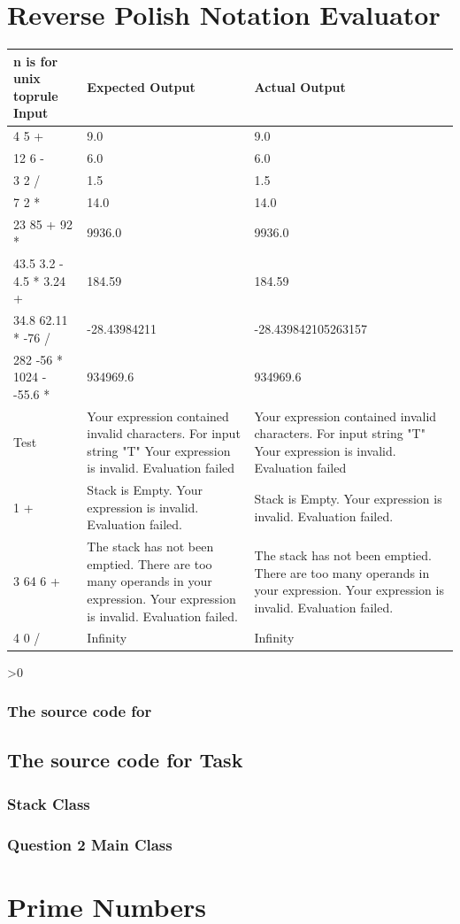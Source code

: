 \documentclass[12pt,a4paper,onesided]{report}
\newcommand{\source}{\pagebreak
	\ifnum\value{section}>0
		\subsection{The source code for \thesection}

	\else
		\section{The source code for Task \thechapter}

	\fi
	}
\begin{document}
\chapter{Reverse Polish Notation Evaluator}
\begin{table}[h!]
	\centering
\begin{tabular}{lp{28ex}p{28ex}}
	\\n is for unix 
	toprule Input & Expected Output & Actual Output\\
	\midrule
	4 5 + & 9.0 & 9.0\\
	12 6 - & 6.0 & 6.0\\
	3 2 / & 1.5 & 1.5 \\
	7 2 * & 14.0 & 14.0\\
	23 85 + 92 * & 9936.0 & 9936.0 \\
	43.5 3.2 - 4.5 * 3.24 + & 184.59 & 184.59 \\
	34.8 62.11 * -76 / & -28.43984211 & -28.439842105263157\\
	282 -56 * 1024 - -55.6 * & 934969.6 & 934969.6\\
	Test & Your expression contained invalid characters. For input string "T" Your expression is invalid. Evaluation failed& Your expression contained invalid characters. For input string "T" Your expression is invalid. Evaluation failed\\ 
	1 + & Stack is Empty. Your expression is invalid. Evaluation failed. &  Stack is Empty. Your expression is invalid. Evaluation failed.\\
	3 64 6 + & The stack has not been emptied. There are too many operands in your expression. Your expression is invalid. Evaluation failed. & The stack has not been emptied. There are too many operands in your expression. Your expression is invalid. Evaluation failed. \\
	4 0 / & Infinity & Infinity \\
	\bottomrule
\end{tabular}
\end{table}
\source
\subsection{Stack Class}

\newpage
\subsection{Question 2 Main Class}

\chapter{Prime Numbers}
\end{document}
